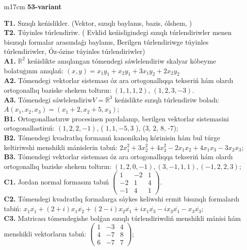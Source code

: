 \documentclass{article}
\begin{document}
\begin{tabular}{m{17cm}}
\textbf{53-variant}
\newline

\textbf{T1.} Sızıqlı keńislikler.   (Vektor,  sızıqlı baylanıs, bazis, ólshem, )  \\
\textbf{T2.} Túyinles túrlendiriw. ( Evklid keńisligindegi sızıqlı túrlendiriwler menen bisızıqlı formalar arasındaǵı baylanıs, Berilgen túrlendiriwge túyinles túrlendiriwler, Óz-ózine túyinles túrlendiriwler) \\
\textbf{A1.} \(\mathbb{R}^{2}\) keńislikte anıqlangan tómendegi sáwlelendiriw skalyar kóbeyme bolatuģının anıqlań: \((x,y) = x_{1}y_{1} + x_{2}y_{1} + 3x_{1}y_{2} + 2x_{2}y_{2}\) \\
\textbf{A2.} Tómendegi vektorlar sisteması óz ara ortogonallıqqa tekseriń hám olardı ortogonallıq baziske shekem toltırın: \((1,1,1,2)\), \((1,2,3, - 3)\). \\
\textbf{A3.} Tómendegi sáwlelendiriw\(V = \mathbb{R}^{3}\) keńislikte sızıqlı túrlendiriw boladı: \(A\left( x_{1},x_{2},x_{3} \right) = \left( x_{1} + 2,x_{2} + 5,x_{3} \right)\); \\
\textbf{B1.} Ortogonallastırıw procesinen paydalanıp, berilgen vektorlar sistemasini ortogonallastirıń: \((1,2,2, - 1)\), ( \(1,1, - 5,3\) ), (3, 2, 8, -7); \\
\textbf{B2.} Tómendegi kvadratlıq formanıń kanonikalıq kórinisin hám bul túrge keltiriwshi menshikli mánislerin tabıń: \(2x_{1}^{2} + 3x_{2}^{2} + 4x_{3}^{2} - 2x_{1}x_{2} + 4x_{1}x_{3} - 3x_{2}x_{3}\); \\
\textbf{B3.} Tómendegi vektorlar sisteması óz ara ortogonallıqqa tekseriń hám olardı ortogonallıq baziske shekem toltırın: \((1,2,0, - 1),(3, - 1,1,1),( - 1,2,2,3)\); \\
\textbf{C1.} Jordan normal formasını tabıń \(\begin{pmatrix} 1 & - 2 & 1 \\  - 2 & 1 & 4 \\  - 1 & 4 & 1 \end{pmatrix}\). \\
\textbf{C2.} Tómendegi kvadratlıq formalarga sáykes keliwshi ermit bisızıqlı formalardı tabiń: \(x_{1}\overline{x_{1}} + (2 + i)x_{1}\overline{x_{2}} + (2 - i)x_{2}\overline{x_{1}} + ix_{1}\overline{x_{3}} - ix_{3}\overline{x_{1}} - x_{3}\overline{x_{3}}\); \\
\textbf{C3.} Matricası tómendegishe bolǵan sızıqlı túrlendiriwdiń menshikli mánisi hám menshikli vektorların tabıń: \(\begin{pmatrix} 1 & - 3 & 4 \\ 4 & - 7 & 8 \\ 6 & - 7 & 7 \end{pmatrix}\); \\

\end{tabular}
\vspace{1cm}
\end{document}
